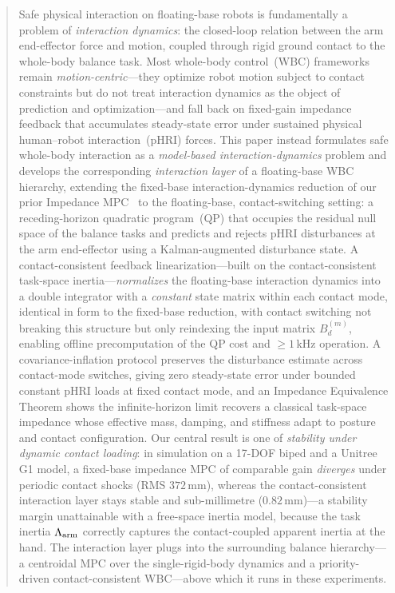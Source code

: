 \begin{abstract}
Safe physical interaction on floating-base robots is fundamentally a problem
of \emph{interaction dynamics}: the closed-loop relation between the arm
end-effector force and motion, coupled through rigid ground contact to the
whole-body balance task.
Most whole-body control~(WBC) frameworks remain \emph{motion-centric}---they
optimize robot motion subject to contact constraints but do not treat
interaction dynamics as the object of prediction and optimization---and fall
back on fixed-gain impedance feedback that accumulates steady-state error
under sustained physical human--robot interaction~(pHRI) forces.
This paper instead formulates safe whole-body interaction as a
\emph{model-based interaction-dynamics} problem and develops the corresponding
\emph{interaction layer} of a floating-base WBC hierarchy, extending the
fixed-base interaction-dynamics reduction of our prior Impedance
MPC~\cite{cao2026impedance} to the floating-base, contact-switching setting: a
receding-horizon quadratic program~(QP) that occupies the residual null space
of the balance tasks and predicts and rejects pHRI disturbances at the arm
end-effector using a Kalman-augmented disturbance state.
A contact-consistent feedback linearization---built on the contact-consistent
task-space inertia---\emph{normalizes} the floating-base interaction dynamics
into a double integrator with a \emph{constant} state matrix within each
contact mode, identical in form to the fixed-base reduction, with contact
switching not breaking this structure but only reindexing the input matrix
$B_d^{(m)}$, enabling offline precomputation of the QP cost and
${\geq}1$\,kHz operation.
A covariance-inflation protocol preserves the disturbance estimate across
contact-mode switches, giving zero steady-state error under bounded constant
pHRI loads at fixed contact mode, and an Impedance Equivalence Theorem shows
the infinite-horizon limit recovers a classical task-space impedance whose
effective mass, damping, and stiffness adapt to posture and contact
configuration.
Our central result is one of \emph{stability under dynamic contact loading}:
in simulation on a 17-DOF biped and a Unitree G1 model, a fixed-base impedance
MPC of comparable gain \emph{diverges} under periodic contact shocks
(RMS $372$\,mm), whereas the contact-consistent interaction layer stays stable
and sub-millimetre ($0.82$\,mm)---a stability margin unattainable with a
free-space inertia model, because the task inertia $\Larm$ correctly captures
the contact-coupled apparent inertia at the hand.
The interaction layer plugs into the surrounding balance hierarchy---a
centroidal MPC over the single-rigid-body dynamics and a priority-driven
contact-consistent WBC---above which it runs in these experiments.
\end{abstract}

